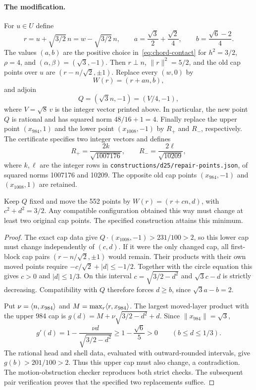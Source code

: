 \paragraph{The modification.}
For $u\in U$ define
\[
r=u+\sqrt{3/2}\,n=w-\sqrt{3/2}\,n,\qquad
a=\frac{\sqrt3}{2}+\frac{\sqrt2}{4},\qquad
b=\frac{\sqrt6-2}{4}.
\]
The values $(a,b)$ are the positive choice in~\eqref{eq:chord-contact}
for $h^2=3/2$, $\rho=4$, and $(\alpha,\beta)=(\sqrt3,-1)$.
Then $r\perp n$, $\|r\|^2=5/2$, and the old cap points over $u$ are
$(r-n/\sqrt2,\pm1)$. Replace every $(w,0)$ by
\[
 W(r)=(r+a n,b),
\]
and adjoin
\[
 Q=(\sqrt3 n,-1)=(V/4,-1),
\]
where $V=\sqrt8\,v$ is the integer vector printed above. In particular,
the new point $Q$ is rational and has squared norm $48/16+1=4$.
Finally replace the upper point $(x_{984},1)$ and the lower point
$(x_{1008},-1)$ by $R_+$ and $R_-$, respectively. The certificate specifies
two integer vectors and defines
\[
 R_+=\frac{2k}{\sqrt{1007176}},\qquad
 R_-=\frac{2\ell}{\sqrt{10209}},
\]
where $k,\ell$ are the integer rows in
\texttt{constructions/d25/repair-points.json}, of squared norms
1007176 and 10209.
The opposite old cap points $(x_{984},-1)$ and $(x_{1008},1)$ are retained.

\begin{proposition}\label{prop:motion-two-repairs}
Keep $Q$ fixed and move the 552 points by
$W(r)=(r+cn,d)$, with $c^2+d^2=3/2$.
Any compatible configuration obtained this way must change at least
two original cap points. The specified construction attains this minimum.
\end{proposition}
\begin{proof}
The exact cap data give $Q\cdot(x_{1008},-1)>231/100>2$,
so this lower cap must change independently of $(c,d)$.
If it were the only changed cap, all first-block cap pairs
$(r-n/\sqrt2,\pm1)$ would remain. Their products with their own
moved points require $-c/\sqrt2+|d|\le-1/2$.
Together with the circle equation this gives $c>0$ and $|d|\le1/3$.
On this interval $c=\sqrt{3/2-d^2}$ and $\sqrt3c-d$ is strictly
decreasing. Compatibility with $Q$ therefore forces $d\ge b$,
since $\sqrt3a-b=2$.

Put $\nu=\langle n,x_{984}\rangle$ and $M=\max_r\langle r,x_{984}\rangle$.
The largest moved-layer product with the upper 984 cap is
$g(d)=M+\nu\sqrt{3/2-d^2}+d$. Since $\|x_{984}\|=\sqrt3$,
\[
 g'(d)=1-\frac{\nu d}{\sqrt{3/2-d^2}}
 \ge1-\frac{\sqrt6}{5}>0\qquad(b\le d\le1/3).
\]
The rational head and shell data, evaluated with outward-rounded
intervals, give $g(b)>201/100>2$. Thus this upper cap must also
change, a contradiction. The motion-obstruction checker reproduces
both strict checks. The subsequent pair verification proves that
the specified two replacements suffice.
\end{proof}

